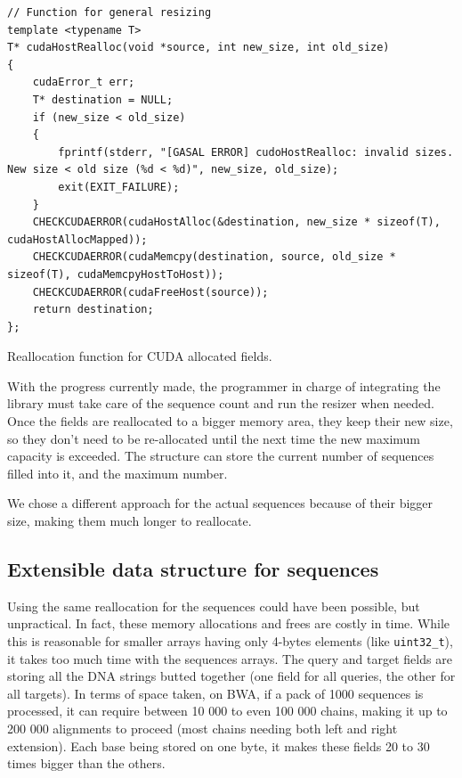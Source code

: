 \begin{listing}[h!]
	\begin{verbatim}
// Function for general resizing
template <typename T>
T* cudaHostRealloc(void *source, int new_size, int old_size) 
{
	cudaError_t err;
	T* destination = NULL;
	if (new_size < old_size)
	{
		fprintf(stderr, "[GASAL ERROR] cudoHostRealloc: invalid sizes. New size < old size (%d < %d)", new_size, old_size);
		exit(EXIT_FAILURE);
	}
	CHECKCUDAERROR(cudaHostAlloc(&destination, new_size * sizeof(T), cudaHostAllocMapped));
	CHECKCUDAERROR(cudaMemcpy(destination, source, old_size * sizeof(T), cudaMemcpyHostToHost));
	CHECKCUDAERROR(cudaFreeHost(source));
	return destination;
};
	\end{verbatim}
	\caption{Reallocation function for CUDA allocated fields.}
	\label{lst:cudarealloc}
\end{listing}

With the progress currently made, the programmer in charge of integrating the library must take care of the sequence count and run the resizer when needed. Once the fields are reallocated to a bigger memory area, they keep their new size, so they don't need to be re-allocated until the next time the new maximum capacity is exceeded. The structure can store the current number of sequences filled into it, and the maximum number. 

We chose a different approach for the actual sequences because of their bigger size, making them much longer to reallocate.

\subsection{Extensible data structure for sequences}

Using the same reallocation for the sequences could have been possible, but unpractical. In fact, these memory allocations and frees are costly in time. While this is reasonable for smaller arrays having only 4-bytes elements (like \verb|uint32_t|), it takes too much time with the sequences arrays. The query and target fields are storing all the DNA strings butted together (one field for all queries, the other for all targets). In terms of space taken, on BWA, if a pack of 1000 sequences is processed, it can require between 10 000 to even 100 000 chains, making it up to 200 000 alignments to proceed (most chains needing both left and right extension). Each base being stored on one byte, it makes these fields 20 to 30 times bigger than the others.


